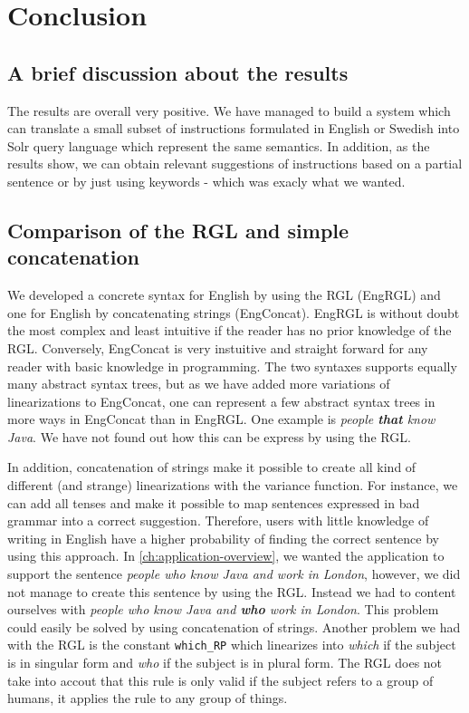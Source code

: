 \chapter{Conclusion}\label{ch:conclusion}
\section{A brief discussion about the results}
The results are overall very positive. We have managed to build a system which can translate a small subset of instructions formulated in English or Swedish into Solr query language which represent the same semantics. In addition, as the results show, we can obtain relevant suggestions of instructions based on a partial sentence or by just using keywords - which was exacly what we wanted.

\section{Comparison of the RGL and simple concatenation}\label{sec:comparison}
We developed a concrete syntax for English by using the RGL (EngRGL) and one for English by concatenating strings (EngConcat). EngRGL is without doubt the most complex and least intuitive if the reader has no prior knowledge of the RGL. Conversely, EngConcat is very instuitive and straight forward for any reader with basic knowledge in programming. The two syntaxes supports equally many abstract syntax trees, but as we have added more variations of linearizations to EngConcat, one can represent a few abstract syntax trees in more ways in EngConcat than in EngRGL. One example is \emph{people \textbf{that} know Java}. We have not found out how this can be express by using the RGL.

In addition, concatenation of strings make it possible to create all kind of different (and strange) linearizations with the variance function. For instance, we can add all tenses and make it possible to map sentences expressed in bad grammar into a correct suggestion. Therefore, users with little knowledge of writing in English have a higher probability of finding the correct sentence by using this approach.
\newline
\newline
In \autoref{ch:application-overview}, we wanted the application to support the sentence \emph{people who know Java and work in London}, however, we did not manage to create this sentence by using the RGL. Instead we had to content ourselves with \emph{people who know Java and \textbf{who} work in London}. This problem could easily be solved by using concatenation of strings.
\newline
\newline
Another problem we had with the RGL is the constant \texttt{which\_RP} which linearizes into \emph{which} if the subject is in singular form and \emph{who} if the subject is in plural form. The RGL does not take into accout that this rule is only valid if the subject refers to a group of humans, it applies the rule to any group of things.

